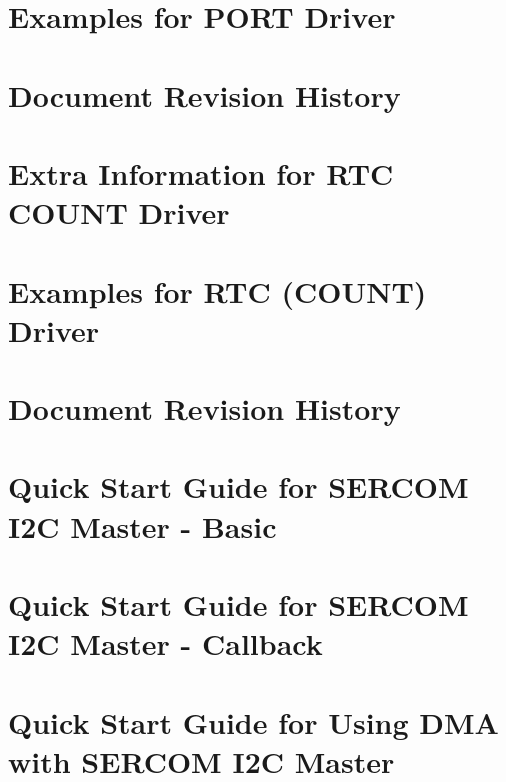 \documentclass[twoside]{book}
\newcommand{\+}{\discretionary{\mbox{\scriptsize$\hookleftarrow$}}{}{}}
\begin{document}
\chapter{Examples for PORT Driver}
\label{asfdoc_sam0_port_exqsg}

\chapter{Document Revision History}
\label{asfdoc_sam0_port_document_revision_history}

\chapter{Extra Information for RTC COUNT Driver}
\label{asfdoc_sam0_rtc_count_extra}

\chapter{Examples for RTC (COUNT) Driver}
\label{asfdoc_sam0_rtc_count_exqsg}

\chapter{Document Revision History}
\label{asfdoc_sam0_rtc_count_document_revision_history}

\chapter{Quick Start Guide for SERCOM I2C Master -\/ Basic}
\label{asfdoc_sam0_sercom_i2c_master_basic_use_case}

\chapter{Quick Start Guide for SERCOM I2C Master -\/ Callback}
\label{asfdoc_sam0_sercom_i2c_master_callback_use_case}

\chapter{Quick Start Guide for Using DMA with SERCOM I2C Master}
\label{asfdoc_sam0_sercom_i2c_master_dma_use_case}

\end{document}
